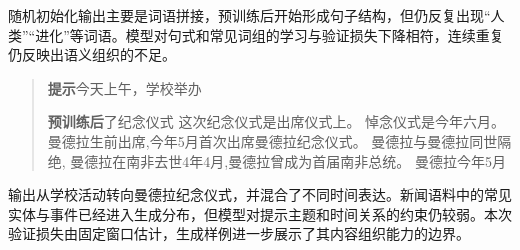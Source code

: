 随机初始化输出主要是词语拼接，预训练后开始形成句子结构，但仍反复出现“人类”“进化”等词语。模型对句式和常见词组的学习与验证损失下降相符，连续重复仍反映出语义组织的不足。

\begin{quote}

\begin{minipage}{\linewidth}\small

\textbf{提示}\quad 今天上午，学校举办\par

\textbf{预训练后}\quad 了纪念仪式 这次纪念仪式是出席仪式上。 悼念仪式是今年六月。 曼德拉生前出席,今年5月首次出席曼德拉纪念仪式。 曼德拉与曼德拉同世隔绝, 曼德拉在南非去世4年4月,曼德拉曾成为首届南非总统。 曼德拉今年5月\par

\end{minipage}

\end{quote}

输出从学校活动转向曼德拉纪念仪式，并混合了不同时间表达。新闻语料中的常见实体与事件已经进入生成分布，但模型对提示主题和时间关系的约束仍较弱。本次验证损失由固定窗口估计，生成样例进一步展示了其内容组织能力的边界。
